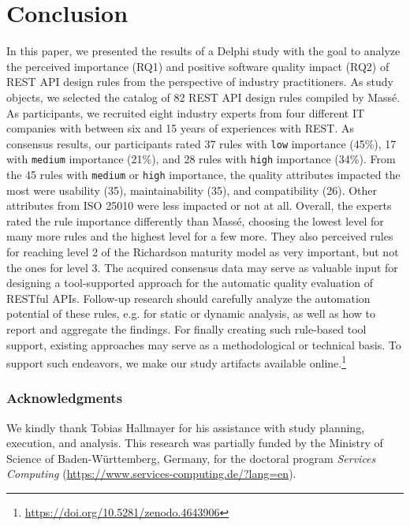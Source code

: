 \documentclass[runningheads]{llncs}
\begin{document}
\section{Conclusion}
\label{sec:conclusion}
In this paper, we presented the results of a Delphi study with the goal to analyze the perceived importance (RQ1) and positive software quality impact (RQ2) of REST API design rules from the perspective of industry practitioners.
As study objects, we selected the catalog of 82 REST API design rules compiled by Massé.
As participants, we recruited eight industry experts from four different IT companies with between six and 15 years of experiences with REST.
As consensus results, our participants rated 37 rules with \texttt{low} importance (45\%), 17 with \texttt{medium} importance (21\%), and 28 rules with \texttt{high} importance (34\%).
From the 45 rules with \texttt{medium} or \texttt{high} importance, the quality attributes impacted the most were usability (35), maintainability (35), and compatibility (26).
Other attributes from ISO 25010 were less impacted or not at all.
Overall, the experts rated the rule importance differently than Massé, choosing the lowest level for many more rules and the highest level for a few more.
They also perceived rules for reaching level 2 of the Richardson maturity model as very important, but not the ones for level 3.
The acquired consensus data may serve as valuable input for designing a tool-supported approach for the automatic quality evaluation of RESTful APIs.
Follow-up research should carefully analyze the automation potential of these rules, e.g. for static or dynamic analysis, as well as how to report and aggregate the findings.
For finally creating such rule-based tool support, existing approaches may serve as a methodological or technical basis.
To support such endeavors, we make our study artifacts available online.\footnote{\url{https://doi.org/10.5281/zenodo.4643906}}

\subsubsection*{Acknowledgments}
We kindly thank Tobias Hallmayer for his assistance with study planning, execution, and analysis.
This research was partially funded by the Ministry of Science of Baden-Württemberg, Germany, for the doctoral program \textit{Services Computing} (\url{https://www.services-computing.de/?lang=en}).

%
%


%
\end{document}
